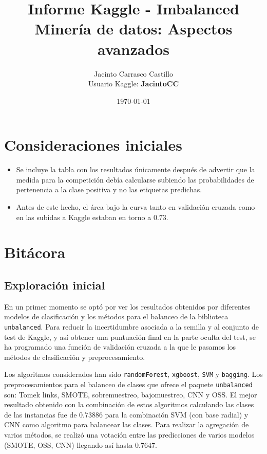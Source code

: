 \documentclass[11pt]{article}
\author{Jacinto Carrasco Castillo \\   Usuario Kaggle: \textbf{JacintoCC}}
\date{\today}
\title{Informe Kaggle - Imbalanced\\\medskip
\large Minería de datos: Aspectos avanzados}
\begin{document}
\maketitle
\tableofcontents


\section{Consideraciones iniciales}
\label{sec:org29836c9}

\begin{itemize}
\item Se incluye la tabla con los resultados únicamente después de
advertir que la medida para la competición debía calcularse subiendo
las probabilidades de pertenencia a la clase positiva y no las
etiquetas predichas.
\item Antes de este hecho, el área bajo la curva tanto en validación
cruzada como en las subidas a Kaggle estaban en torno a \(0.73\).
\end{itemize}

\section{Bitácora}
\label{sec:org4f38474}

\subsection{Exploración inicial}
\label{sec:org4dc3ea9}

En un primer momento se optó por ver los resultados obtenidos por
diferentes modelos de clasificación y los métodos para el balanceo de
la biblioteca \texttt{unbalanced}. Para reducir la incertidumbre asociada a
la semilla y al conjunto de test de Kaggle, y así obtener una
puntuación final en la parte oculta del test, se ha programado una
función de validación cruzada a la que le pasamos los métodos de
clasificación y preprocesamiento. 

Los algoritmos considerados han sido \texttt{randomForest}, \texttt{xgboost}, \texttt{SVM}
y \texttt{bagging}. Los preprocesamientos para el balanceo de clases que
ofrece el paquete \texttt{unbalanced} son: Tomek links, SMOTE, sobremuestreo,
bajomuestreo, CNN y OSS. El mejor resultado obtenido con la
combinación de estos algoritmos calculando las clases de las
instancias fue de 0.73886 para la combinación SVM (con base radial) y
CNN como algoritmo para balancear las clases. Para realizar la
agregación de varios métodos, se realizó una votación entre las
predicciones de varios modelos (SMOTE, OSS, CNN) llegando así hasta
0.7647.
\end{document}

